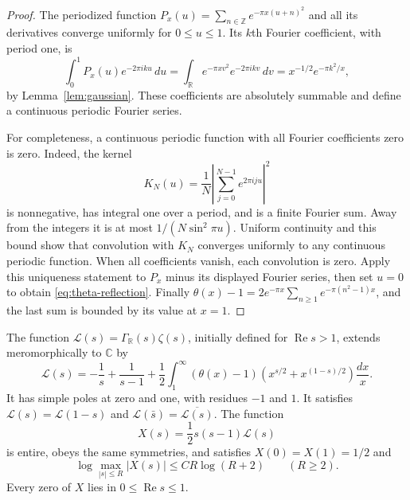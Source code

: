 \documentclass[11pt]{article}
\numberwithin{equation}{section}
\newcommand{\R}{\mathbb R}
\newcommand{\C}{\mathbb C}
\newcommand{\Z}{\mathbb Z}
\begin{document}
\begin{proof}
The periodized function
$P_x(u)=\sum_{n\in\Z}e^{-\pi x(u+n)^2}$ and all its derivatives converge
uniformly for $0\leq u\leq1$.
Its $k$th Fourier coefficient, with period one, is
\[
 \int_0^1P_x(u)e^{-2\pi iku}\,du
 =\int_{\R}e^{-\pi xv^2}e^{-2\pi ikv}\,dv
 =x^{-1/2}e^{-\pi k^2/x},
\]
by Lemma~\ref{lem:gaussian}.
These coefficients are absolutely summable and define a continuous
periodic Fourier series.

For completeness, a continuous periodic function with all Fourier
coefficients zero is zero.  Indeed, the kernel
\[
 K_N(u)=\frac1N\left|\sum_{j=0}^{N-1}e^{2\pi iju}\right|^2
\]
is nonnegative, has integral one over a period, and is a finite Fourier sum.
Away from the integers it is at most $1/(N\sin^2\pi u)$.
Uniform continuity and this bound show that convolution with $K_N$ converges
uniformly to any continuous periodic function.
When all coefficients vanish, each convolution is zero.
Apply this uniqueness statement to $P_x$ minus its displayed Fourier series,
then set $u=0$ to obtain \eqref{eq:theta-reflection}.
Finally
$\theta(x)-1=2e^{-\pi x}\sum_{n\geq1}e^{-\pi(n^2-1)x}$,
and the last sum is bounded by its value at $x=1$.
\end{proof}

\begin{theorem}
\label{thm:completion}
The function $\mathcal L(s)=\Gamma_{\R}(s)\zeta(s)$, initially defined for
$\operatorname{Re}s>1$, extends meromorphically to $\C$ by
\begin{equation}
 \mathcal L(s)=-\frac1s+\frac1{s-1}
   +\frac12\int_1^\infty(\theta(x)-1)
                   \left(x^{s/2}+x^{(1-s)/2}\right)\frac{dx}{x}.
 \label{eq:theta-mellin}
\end{equation}
It has simple poles at zero and one, with residues $-1$ and $1$.
It satisfies $\mathcal L(s)=\mathcal L(1-s)$ and
$\mathcal L(\bar s)=\overline{\mathcal L(s)}$.
The function
\begin{equation}
 X(s)=\frac12 s(s-1)\mathcal L(s)
 \label{eq:entire-completion}
\end{equation}
is entire, obeys the same symmetries, and satisfies
$X(0)=X(1)=1/2$ and
\begin{equation}
 \log\max_{|s|\leq R}|X(s)|\leq C R\log(R+2)\qquad(R\geq2).
 \label{eq:entire-growth}
\end{equation}
Every zero of $X$ lies in $0\leq\operatorname{Re}s\leq1$.
\end{theorem}
\end{document}
